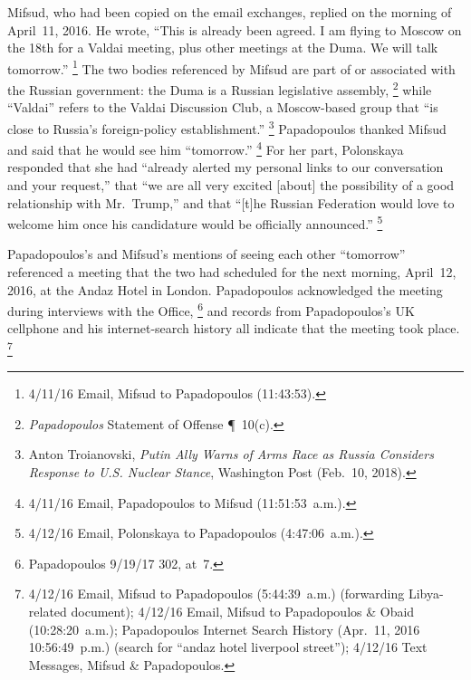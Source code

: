 Mifsud, who had been copied on the email exchanges, replied on the morning of April~11, 2016.
He wrote, ``This is already been agreed.
I am flying to Moscow on the 18th for a Valdai meeting, plus other meetings at the Duma.
We will talk tomorrow.''%
\footnote{4/11/16 Email, Mifsud to Papadopoulos (11:43:53).}
The two bodies referenced by Mifsud are part of or associated with the Russian government: the Duma is a Russian legislative assembly,%
\footnote{\textit{Papadopoulos} Statement of Offense \P~10(c).}
while ``Valdai'' refers to the Valdai Discussion Club, a Moscow-based group that ``is close to Russia's foreign-policy establishment.''%
\footnote{Anton Troianovski, \textit{Putin Ally Warns of Arms Race as Russia Considers Response to U.S. Nuclear Stance}, Washington Post (Feb.~10, 2018).}
Papadopoulos thanked Mifsud and said that he would see him ``tomorrow.''%
\footnote{4/11/16 Email, Papadopoulos to Mifsud (11:51:53~a.m.).}
For her part, Polonskaya responded that she had ``already alerted my personal links to our conversation and your request,'' that ``we are all very excited [about] the possibility of a good relationship with Mr.~Trump,'' and that ``[t]he Russian Federation would love to welcome him once his candidature would be officially announced.''%
\footnote{4/12/16 Email, Polonskaya to Papadopoulos (4:47:06~a.m.).}

Papadopoulos's and Mifsud's mentions of seeing each other ``tomorrow'' referenced a meeting that the two had scheduled for the next morning, April~12, 2016, at the Andaz Hotel in London.
Papadopoulos acknowledged the meeting during interviews with the Office,%
\footnote{Papadopoulos 9/19/17 302, at~7.}
and records from Papadopoulos's UK cellphone and his internet-search history all indicate that the meeting took place.%
\footnote{4/12/16 Email, Mifsud to Papadopoulos (5:44:39~a.m.) (forwarding Libya-related document); 4/12/16 Email, Mifsud to Papadopoulos \& Obaid (10:28:20~a.m.); Papadopoulos Internet Search History (Apr.~11, 2016 10:56:49~p.m.) (search for ``andaz hotel liverpool street''); 4/12/16 Text Messages, Mifsud \& Papadopoulos.}

